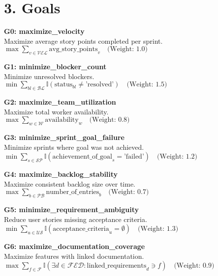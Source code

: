 \documentclass[12pt]{article}
\begin{document}
\section{3. Goals}
\item \textbf{G0: maximize\_velocity} \\
    Maximize average story points completed per sprint. \\
    $\max \sum_{v \in \mathcal{VEL}} \text{avg\_story\_points}_v \quad \text{(Weight: 1.0)}$

    \item \textbf{G1: minimize\_blocker\_count} \\
    Minimize unresolved blockers. \\
    $\min \sum_{bl \in \mathcal{BL}} \mathbb{I}(\text{status}_{bl} \neq \text{'resolved'}) \quad \text{(Weight: 1.5)}$

    \item \textbf{G2: maximize\_team\_utilization} \\
    Maximize total worker availability. \\
    $\max \sum_{w \in \mathcal{W}} \text{availability}_w \quad \text{(Weight: 0.8)}$

    \item \textbf{G3: minimize\_sprint\_goal\_failure} \\
    Minimize sprints where goal was not achieved. \\
    $\min \sum_{s \in \mathcal{SP}} \mathbb{I}(\text{achievement\_of\_goal}_s = \text{'failed'}) \quad \text{(Weight: 1.2)}$

    \item \textbf{G4: maximize\_backlog\_stability} \\
    Maximize consistent backlog size over time. \\
    $\max \sum_{b \in \mathcal{PB}} \text{number\_of\_entries}_b \quad \text{(Weight: 0.7)}$

    \item \textbf{G5: minimize\_requirement\_ambiguity} \\
    Reduce user stories missing acceptance criteria. \\
    $\min \sum_{u \in \mathcal{US}} \mathbb{I}(\text{acceptance\_criteria}_u = \emptyset) \quad \text{(Weight: 1.3)}$

    \item \textbf{G6: maximize\_documentation\_coverage} \\
    Maximize features with linked documentation. \\
    $\max \sum_{f \in \mathcal{F}} \mathbb{I}(\exists d \in \mathcal{FED} : \text{linked\_requirements}_d \ni f) \quad \text{(Weight: 0.9)}$
\end{document}
